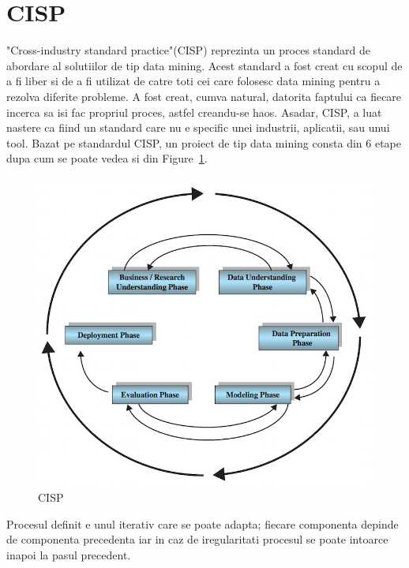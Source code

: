 \section{CISP}
"Cross-industry standard practice"(CISP) reprezinta un proces standard de abordare al solutiilor de tip data mining. Acest standard a fost creat cu scopul de a fi liber si de a fi utilizat de catre toti cei care folosesc data mining pentru a rezolva diferite probleme. A fost creat, cumva natural, datorita faptului ca fiecare incerca sa isi fac propriul proces, astfel creandu-se haos. Asadar, CISP, a luat nastere ca fiind un standard care nu e specific unei industrii, aplicatii, sau unui tool. Bazat pe standardul CISP, un proiect de tip data mining consta din 6 etape dupa cum se poate vedea si din Figure~\ref{fig:CISP}. 
\begin{figure}[th]
\centering
\includegraphics{Figures/CISP}
\decoRule
\caption[CISP]{CISP}
\label{fig:CISP}
\end{figure}
Procesul definit e unul iterativ care se poate adapta; fiecare componenta depinde de componenta precedenta iar in caz de iregularitati procesul se poate intoarce inapoi la pasul precedent.

